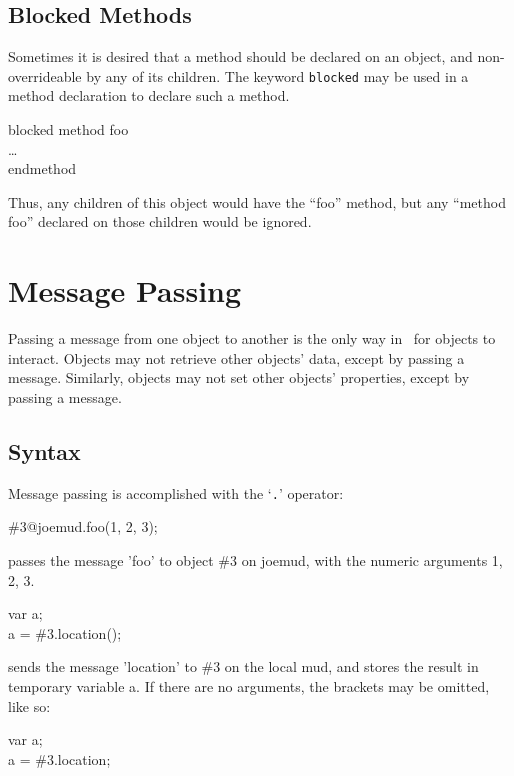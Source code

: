 \subsection{Blocked Methods}

Sometimes it is desired that a method should be declared on an object, and
non-overrideable by any of its children.  The keyword {\tt blocked} may be
used in a method declaration to declare such a method.

\begin{code}
blocked method foo \\
    \ind \ldots \\
endmethod
\end{code}

Thus, any children of this object would have the ``foo'' method, but any
``method foo'' declared on those children would be ignored.

\section{Message Passing}

Passing a message from one object to another is the only way in
\COOLMUD\ for objects to interact.  Objects may not retrieve other
objects' data, except by passing a message.  Similarly, objects may
not set other objects' properties, except by passing a message.

\subsection{Syntax}

Message passing is accomplished with the `\verb+.+' operator:

\begin{code}
\#3@joemud.foo(1, 2, 3);
\end{code}

passes the message 'foo' to object \#3 on joemud, with the
numeric arguments 1, 2, 3.

\begin{code}
var a; \\
a = \#3.location();
\end{code}

sends the message 'location' to \#3 on the local mud, and stores the
result in temporary variable a.  If there are no arguments, the
brackets may be omitted, like so:
    
\begin{code}
var a; \\
a = \#3.location;
\end{code}

